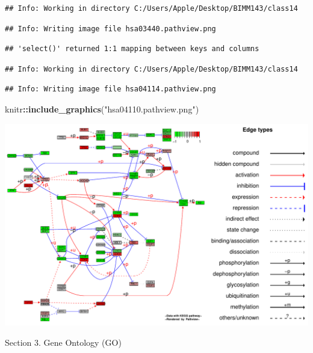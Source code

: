 \documentclass[
]{article}
\newenvironment{Shaded}{\begin{snugshade}}{\end{snugshade}}
\newcommand{\AttributeTok}[1]{\textcolor[rgb]{0.13,0.29,0.53}{#1}}
\newcommand{\CommentTok}[1]{\textcolor[rgb]{0.56,0.35,0.01}{\textit{#1}}}
\newcommand{\ConstantTok}[1]{\textcolor[rgb]{0.56,0.35,0.01}{#1}}
\newcommand{\FunctionTok}[1]{\textcolor[rgb]{0.13,0.29,0.53}{\textbf{#1}}}
\newcommand{\NormalTok}[1]{#1}
\newcommand{\OtherTok}[1]{\textcolor[rgb]{0.56,0.35,0.01}{#1}}
\newcommand{\SpecialCharTok}[1]{\textcolor[rgb]{0.81,0.36,0.00}{\textbf{#1}}}
\newcommand{\StringTok}[1]{\textcolor[rgb]{0.31,0.60,0.02}{#1}}
\begin{document}
\begin{verbatim}
## Info: Working in directory C:/Users/Apple/Desktop/BIMM143/class14
\end{verbatim}

\begin{verbatim}
## Info: Writing image file hsa03440.pathview.png
\end{verbatim}

\begin{verbatim}
## 'select()' returned 1:1 mapping between keys and columns
\end{verbatim}

\begin{verbatim}
## Info: Working in directory C:/Users/Apple/Desktop/BIMM143/class14
\end{verbatim}

\begin{verbatim}
## Info: Writing image file hsa04114.pathview.png
\end{verbatim}

\begin{Shaded}
\begin{Highlighting}[]
\NormalTok{knitr}\SpecialCharTok{::}\FunctionTok{include\_graphics}\NormalTok{(}\StringTok{"hsa04110.pathview.png"}\NormalTok{)}
\end{Highlighting}
\end{Shaded}

\includegraphics[width=15.35in]{hsa04110.pathview}

Section 3. Gene Ontology (GO)

\begin{Shaded}
\end{Shaded}
\end{document}
